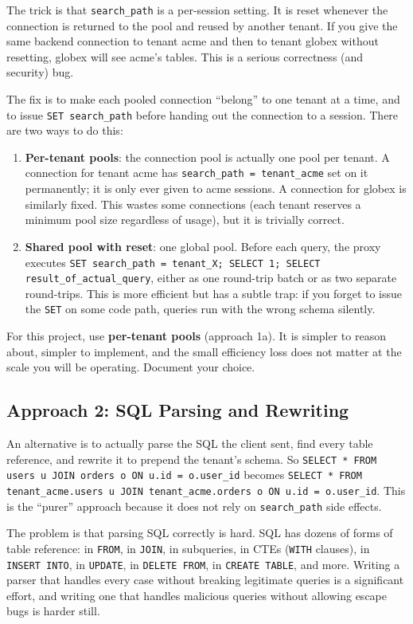 \documentclass[11pt,a4paper]{article}
\begin{document}
The trick is that \texttt{search\_path} is a per-session setting. It is reset whenever the connection is returned to the pool and reused by another tenant. If you give the same backend connection to tenant acme and then to tenant globex without resetting, globex will see acme's tables. This is a serious correctness (and security) bug.

The fix is to make each pooled connection ``belong'' to one tenant at a time, and to issue \texttt{SET search\_path} before handing out the connection to a session. There are two ways to do this:

\begin{enumerate}
\item \textbf{Per-tenant pools}: the connection pool is actually one pool per tenant. A connection for tenant acme has \texttt{search\_path = tenant\_acme} set on it permanently; it is only ever given to acme sessions. A connection for globex is similarly fixed. This wastes some connections (each tenant reserves a minimum pool size regardless of usage), but it is trivially correct.

\item \textbf{Shared pool with reset}: one global pool. Before each query, the proxy executes \texttt{SET search\_path = tenant\_X; SELECT 1; SELECT result\_of\_actual\_query}, either as one round-trip batch or as two separate round-trips. This is more efficient but has a subtle trap: if you forget to issue the \texttt{SET} on some code path, queries run with the wrong schema silently.
\end{enumerate}

For this project, use \textbf{per-tenant pools} (approach 1a). It is simpler to reason about, simpler to implement, and the small efficiency loss does not matter at the scale you will be operating. Document your choice.

\subsection{Approach 2: SQL Parsing and Rewriting}
An alternative is to actually parse the SQL the client sent, find every table reference, and rewrite it to prepend the tenant's schema. So \texttt{SELECT * FROM users u JOIN orders o ON u.id = o.user\_id} becomes \texttt{SELECT * FROM tenant\_acme.users u JOIN tenant\_acme.orders o ON u.id = o.user\_id}. This is the ``purer'' approach because it does not rely on \texttt{search\_path} side effects.

The problem is that parsing SQL correctly is hard. SQL has dozens of forms of table reference: in \texttt{FROM}, in \texttt{JOIN}, in subqueries, in CTEs (\texttt{WITH} clauses), in \texttt{INSERT INTO}, in \texttt{UPDATE}, in \texttt{DELETE FROM}, in \texttt{CREATE TABLE}, and more. Writing a parser that handles every case without breaking legitimate queries is a significant effort, and writing one that handles malicious queries without allowing escape bugs is harder still.
\end{document}
